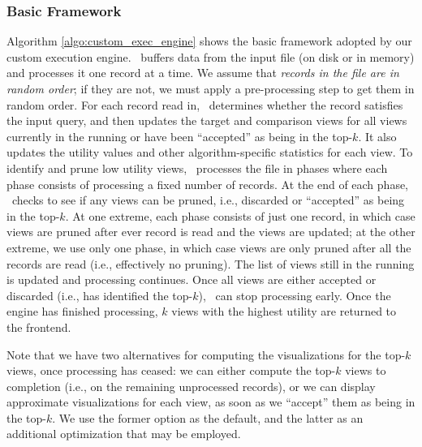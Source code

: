 \subsubsection{Basic Framework}
\label{subsec:basic_framework}
Algorithm \ref{algo:custom_exec_engine} shows the basic framework adopted by our
custom execution engine.
\VizRecDB\ buffers data from the input file (on disk or in memory) and processes it
one record at a time.
We assume that {\it records in the file are in random order}; if they are not,
we must apply a pre-processing step to get them in random order.
For each record read in, \VizRecDB\ determines whether the record satisfies the
input query, and then updates the target and comparison views for all views
currently in the running or have been ``accepted'' as being in the top-$k$.
It also updates the utility values and other algorithm-specific statistics for
each view.
To identify and prune low utility views, \VizRecDB\ processes the file in
phases where each phase consists of processing a fixed number of records.
At the end of each phase, \VizRecDB\ checks to see if any views can be pruned,
i.e., discarded or ``accepted'' as being in the top-$k$.
At one extreme, each phase consists of just one record, in which case views
are pruned after ever record is read and the views are updated;
at the other extreme, we use only one phase, in which case views are only pruned
after all the records are read (i.e., effectively no pruning). 
The list of views still in the running is updated and processing continues.
Once all views are either accepted or discarded (i.e.,
\VizRecDB has identified the top-$k$), \VizRecDB\ can stop processing early.
Once the engine has finished processing, $k$ views with the
highest utility are returned to the frontend.

Note that we have two alternatives for computing the visualizations for the top-$k$
views, once processing has ceased: we can either compute the top-$k$ views to completion (i.e.,
on the remaining unprocessed records),
or we can display approximate visualizations for each view, as soon as we ``accept'' them
as being in the top-$k$. We use the former option as the default, 
and the latter as an additional optimization that may be employed.

